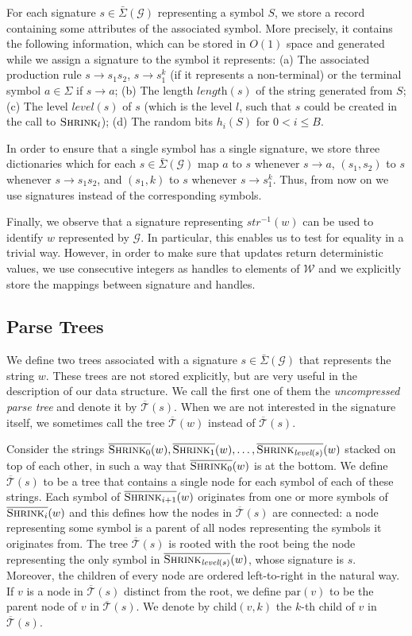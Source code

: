 \documentclass[a4paper]{article}
\theoremstyle{remark}
\newcommand{\sigs}{\bar{\Sigma}}
\newcommand{\shrink}[1]{\ensuremath{\textsc{Shrink}_{#1}}}
\newcommand{\cshrink}[1]{\ensuremath{\overline{\textsc{Shrink}_{#1}}}}
\newcommand{\str}{w}
\newcommand{\hs}{h}
\newcommand{\grammar}{\mathcal{G}}
\newcommand{\mword}{B}
\newcommand{\spair}[3]{\ensuremath{#1 \rightarrow #2#3}}
\newcommand{\spower}[3]{\ensuremath{#1 \rightarrow #2^{#3}}}
\newcommand{\slev}{\textit{level}}
\newcommand{\slength}{\textit{length}}
\newcommand{\sstr}{\textit{str}}
\newcommand{\ustree}{\mathcal{\overline{T}}}
\newcommand{\uspar}{\mathrm{par}}
\newcommand{\uschild}{\mathrm{child}}
\newcommand{\coll}{\mathcal{W}}
\begin{document}
For each signature $s\in \sigs(\grammar)$ representing a symbol $S$,
we store a record containing some attributes of the associated symbol.
More precisely, it contains the following information, which can be stored in $O(1)$ space
and generated while we assign a signature to the symbol it represents: (a) The associated production rule $\spair{s}{s_1}{s_2}$, $\spower{s}{s_1}{k}$ (if it represents a non-terminal) or the terminal symbol $a\in \Sigma$ if $s \to a$; (b) The length $\slength(s)$ of the string generated from $S$; (c) The level $\slev(s)$ of $s$ (which is the level $l$, such that $s$ could be created in the call to $\shrink{l}$); (d) The random bits $\hs_i(S)$ for $0 < i \le \mword$.

In order to ensure that a single symbol has a single signature,
we store three dictionaries which for each $s\in \sigs(\grammar)$ map $a$ to $s$ whenever $s\to a$,  $(s_1,s_2)$ to $s$ whenever $\spair{s}{s_1}{s_2}$, and $(s_1,k)$ to $s$ whenever $\spower{s}{s_1}{k}$.
Thus, from now on we use signatures instead of the corresponding symbols.

Finally, we observe that a signature representing $\sstr^{-1}(w)$ can be used to identify $w$ represented by $\grammar$.
In particular, this enables us to test for equality in a trivial way.
However, in order to make sure that updates return deterministic values, we use consecutive integers as handles to elements of $\coll$
and we explicitly store the mappings between signature and handles.

\subsection{Parse Trees}\label{sec:pt_overview}
We define two trees associated with a signature $s \in \sigs(\grammar)$ that represents the string $\str$.
These trees are not stored explicitly, but are very useful in the description of our data structure.
We call the first one of them the \emph{uncompressed parse tree} and denote it by $\ustree(s)$.
When we are not interested in the signature itself, we sometimes call the tree $\ustree(\str)$ instead of $\ustree(s)$.

Consider the strings $\cshrink{0}(\str), \cshrink{1}(\str), \ldots, \cshrink{\slev(s)}(\str)$ stacked on top of each other, in such a way that $\cshrink{0}(\str)$ is at the bottom.
We define $\ustree(s)$ to be a tree that contains a single node for each symbol of each of these strings.
Each symbol of $\cshrink{i+1}(\str)$ originates from one or more symbols of $\cshrink{i}(\str)$ and this defines how the nodes in $\ustree(s)$ are connected: a node representing some symbol is a parent of all nodes representing the symbols it originates from.
The tree $\ustree(s)$ is rooted with the root being the node representing the only symbol in $\cshrink{\slev(s)}(\str)$,
whose signature is $s$.
Moreover, the children of every node are ordered left-to-right in the natural way.
If $v$ is a node in $\ustree(s)$ distinct from the root, we define $\uspar(v)$ to be the parent node of $v$ in $\ustree(s)$.
We denote by $\uschild(v,k)$ the $k$-th child of $v$ in $\ustree(s)$.
\end{document}
